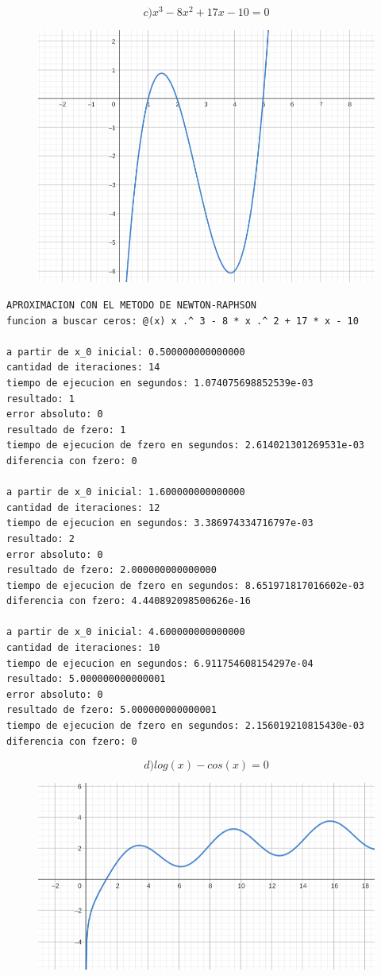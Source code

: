 \documentclass{article}
\begin{document}
\[c) x^3 -8x^2 +17x -10 = 0\]
\begin{figure}[H]
    \centering
    \includegraphics[width=0.8\linewidth]{c.png}
    \label{fig:enter-label}
    \caption{}
\end{figure}

\begin{lstlisting}
APROXIMACION CON EL METODO DE NEWTON-RAPHSON
funcion a buscar ceros: @(x) x .^ 3 - 8 * x .^ 2 + 17 * x - 10

a partir de x_0 inicial: 0.500000000000000
cantidad de iteraciones: 14
tiempo de ejecucion en segundos: 1.074075698852539e-03
resultado: 1
error absoluto: 0
resultado de fzero: 1
tiempo de ejecucion de fzero en segundos: 2.614021301269531e-03
diferencia con fzero: 0  

a partir de x_0 inicial: 1.600000000000000
cantidad de iteraciones: 12
tiempo de ejecucion en segundos: 3.386974334716797e-03
resultado: 2
error absoluto: 0
resultado de fzero: 2.000000000000000
tiempo de ejecucion de fzero en segundos: 8.651971817016602e-03
diferencia con fzero: 4.440892098500626e-16

a partir de x_0 inicial: 4.600000000000000
cantidad de iteraciones: 10
tiempo de ejecucion en segundos: 6.911754608154297e-04
resultado: 5.000000000000001
error absoluto: 0
resultado de fzero: 5.000000000000001
tiempo de ejecucion de fzero en segundos: 2.156019210815430e-03
diferencia con fzero: 0
\end{lstlisting}

\[d) log(x) - cos(x) = 0\]
\begin{figure}[H]
    \centering
    \includegraphics[width=0.7\linewidth]{d.png}
    \label{fig:enter-label}
    \caption{}
\end{figure}
\end{document}
